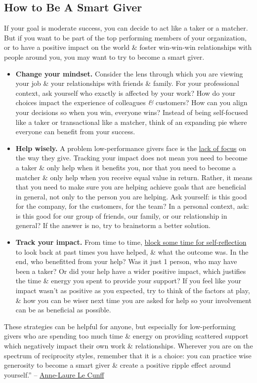 \documentclass[oneside]{book}
\numberwithin{equation}{section}
\begin{document}
\subsection{How to Be A Smart Giver}
If your goal is moderate success, you can decide to act like a taker or a matcher. But if you want to be part of the top performing members of your organization, or to have a positive impact on the world \& foster win-win-win relationships with people around you, you may want to try to become a smart giver.
\begin{itemize}
	\item \textbf{Change your mindset.} Consider the lens through which you are viewing your job \& your relationships with friends \& family. For your professional context, ask yourself who exactly is affected by your work? How do your choices impact the experience of colleagues \textit{\&} customers? How can you align your decisions so when you win, everyone wins? Instead of being self-focused like a taker or transactional like a matcher, think of an expanding pie where everyone can benefit from your success.
	\item \textbf{Help wisely.} A problem low-performance givers face is the \href{https://nesslabs.com/focused-mind}{lack of focus} on the way they give. Tracking your impact does not mean you need to become a taker \& only help when it benefits you, nor that you need to become a matcher \& only help when you receive equal value in return. Rather, it means that you need to make sure you are helping achieve goals that are beneficial in general, not only to the person you are helping. Ask yourself: is this good for the company, for the customers, for the team? In a personal context, ask: is this good for our group of friends, our family, or our relationship in general? If the answer is no, try to brainstorm a better solution.
	\item \textbf{Track your impact.} From time to time, \href{https://nesslabs.com/weekly-review}{block some time for self-reflection} to look back at past times you have helped, \& what the outcome was. In the end, who benefitted from your help? Was it just 1 person, who may have been a taker? Or did your help have a wider positive impact, which justifies the time \& energy you spent to provide your support? If you feel like your impact wasn't as positive as you expected, try to think of the factors at play, \& how you can be wiser next time you are asked for help so your involvement can be as beneficial as possible.
\end{itemize}
These strategies can be helpful for anyone, but especially for low-performing givers who are spending too much time \& energy on providing scattered support which negatively impact their own work \& relationships. Wherever you are on the spectrum of reciprocity styles, remember that it is a choice: you can practice wise generosity to become a smart giver \& create a positive ripple effect around yourself.'' -- \href{https://nesslabs.com/author/annelaure}{Anne-Laure Le Cunff}
\end{document}
